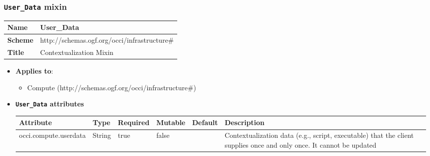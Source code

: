  
\subsubsection{\texttt{User\_Data} mixin}
\begin{center}
\begin{tabular}{|l|l|}
  \hline
  \textbf{Name} & User\_Data \\
  \hline  
  \textbf{Scheme} & http://schemas.ogf.org/occi/infrastructure\# \\
  \hline
  \textbf{Title} & Contextualization Mixin \\
  \hline
\end{tabular}
\end{center}
\begin{itemize}
\item \textbf{Applies to}:
\begin{itemize}
	\item Compute (http://schemas.ogf.org/occi/infrastructure\#)
\end{itemize}
\end{itemize} 

\begin{itemize}
\item \textbf{\texttt{User\_Data} attributes}

\begin{tabularx}{\textwidth}{|l|l|p{1.4cm}|p{1.3cm}|l|X|}
  \hline
  \textbf{Attribute} & \textbf{Type} & \textbf{Required} & \textbf{Mutable} & \textbf{Default} & \textbf{Description} \\
  \hline  
  occi.compute.userdata & String & true & false &  & Contextualization data (e.g., script, executable) that the client supplies once and only once. It cannot be updated \\
  \hline
\end{tabularx}
\end{itemize}


 
